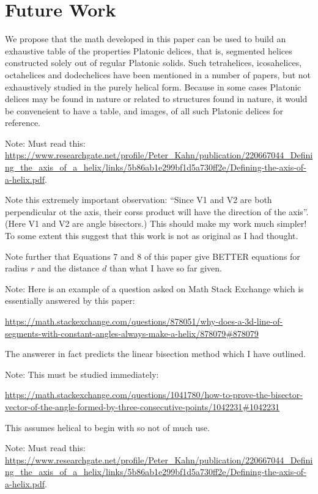 \documentclass[11pt]{article}
\begin{document}
{\section{Future Work}

We propose that the math developed in this paper can be used to build an exhaustive table of the properties {Platonic delices},
that is, segmented helices constructed solely out of regular Platonic solids. Such tetrahelices, icosahelices, octahelices and dodechelices
have been mentioned in a number of papers\cite{elgersma2016quadrahelix,babiker2012combinatorial,lord2001sphere}, but not exhaustively studied in the purely helical form. Because in some cases Platonic delices may be found in nature or related to structures found in nature\cite{lord2004gamma},
it would be conveneient to have a table, and images, of all such Platonic delices for reference.



Note: Must read this: \url{https://www.researchgate.net/profile/Peter_Kahn/publication/220667044_Defining_the_axis_of_a_helix/links/5b86ab1e299bf1d5a730ff2e/Defining-the-axis-of-a-helix.pdf}\cite{kahn1989defining}.

Note this extremely important observation: ``Since V1 and V2 are both perpendicular ot the axis, their corss product will have the direction of the axis''. (Here V1 and V2 are angle bisectors.) This should make my work much simpler!  To some extent this suggest that this work is not as original as I had thought.

Note further that Equations 7 and 8 of this paper give BETTER equations for radius $r$ and the distance $d$ than what I have so far given.


Note: Here is an example of a question asked on Math Stack Exchange which is essentially answered by this paper:

\url{https://math.stackexchange.com/questions/878051/why-does-a-3d-line-of-segments-with-constant-angles-always-make-a-helix/878079#878079}

The answerer in fact predicts the linear bisection method which I have outlined.


Note: This must be studied immediately:

\url{https://math.stackexchange.com/questions/1041780/how-to-prove-the-bisector-vector-of-the-angle-formed-by-three-consecutive-points/1042231#1042231}

This assumes helical to begin with so not of much use.

Note: Must read this: \url{https://www.researchgate.net/profile/Peter_Kahn/publication/220667044_Defining_the_axis_of_a_helix/links/5b86ab1e299bf1d5a730ff2e/Defining-the-axis-of-a-helix.pdf}\cite{kahn1989defining}.



}
\end{document}
